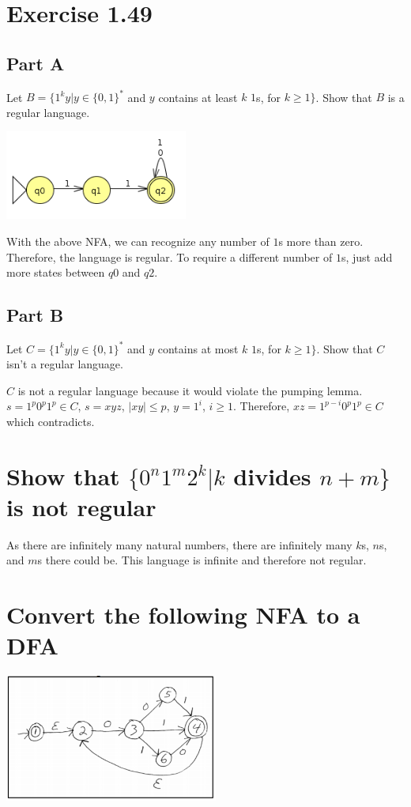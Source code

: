 \documentclass[a4paper,12pt]{article}
\begin{document}
\section{Exercise 1.49}
\subsection{Part A}
Let $B = \{1^k y| y \in \{0, 1\}^*$ and $y$ contains at least $k$ $1$s, for $k \geq 1\}$.
Show that $B$ is a regular language.

\includegraphics[width=6cm]{q8}

With the above NFA, we can recognize any number of $1$s more than zero.
Therefore, the language is regular.
To require a different number of $1$s, just add more states between $q0$ and $q2$.

\subsection{Part B}
Let $C = \{1^k y| y \in \{0, 1\}^*$ and $y$ contains at most $k$ $1$s, for $k \geq 1\}$.
Show that $C$ isn't a regular language.

$C$ is not a regular language because it would violate the pumping lemma.
$s = 1^p0^p1^p \in C$, $s=xyz$, $|xy|\leq p$, $y=1^i$, $i \geq 1$.
Therefore, $xz=1^{p-i}0^p1^p\in C$ which contradicts.

\section{Show that $\{0^n1^m2^k | k$ divides $n + m\}$ is not regular}
As there are infinitely many natural numbers, there are infinitely many $k$s, $n$s, and $m$s there could be.
This language is infinite and therefore not regular.

\section{Convert the following NFA to a DFA}
\includegraphics[width=7cm]{q10q}
\end{document}
